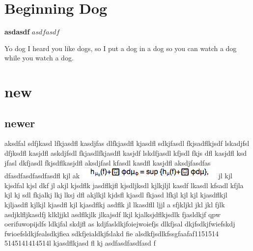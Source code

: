 \documentclass{article}
\begin{document}
\section{Beginning Dog}
\textbf{asdasdf}
$asdfasdf$

Yo dog I heard you like dogs, so I put a dog in a dog so you can watch a dog while you watch a dog. \section{new}
\subsection{newer}
aksdfal sdfjkasd lfkjasdfl kasdjfas dlfkjasdfl kjasdfl sdkjfasdl fkjsadflkjsdf lskadjfsl dfjksdfl kasjdfl askdjfsdl fkjasdlfkjasdfl kasjdf lskdfjasdl kfjsdl fkjs
dfl kasjdfl ksd
jfasl dkfjasdl fkjsdflkasjdfl aksdjfasl kfasdl kasdfl kasjdfl 
aksdjfasdfas
dfasdfasdfasdfasdfl kjl ak
\includegraphics{mathsnippet-libreoffice.png}
jl kjl kjsdfal kjsl dkf
jl akjl  kjsdflk
jasdflkjfl kjsdljksdl kjlkjljl
 kasdf lkasdl kfsadl kfjla kjl kj
sdl fkjalkj lkj lksj
dfl akjlkjl kjdsfl kjasdl fkjasd
lfkjl kjl kjl
kjasdflkjl
kjljasdfl kjlkjl
 kjasdfl kjl kjasdflkj
asdflk jl lkasdfll  ljjl a
sfjkljkl jkl jkl fjlk asdjklfljkasdfj
klkljjkl asdflkjlk jlkajsdf
lkjl kjalksjdflkjsdlk
fjasldkjf
qpw
oerifuwopijdfs
ldkjfal  skdjfl as
kdjfasldkjfoiejwoiefjs
dlkfjsal dkjfsdkjfwiefskdj
fwioefsldkjfealsdkjfiea
sdkfjeialdkjfslakd  fie
alsdkfjsdlkfssgfaafaf1151514
5145141414514l kjasdflkjasd
fl kj asdfasdfasdfasd
f
\end{document}
